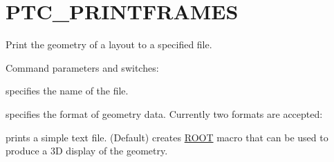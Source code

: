 








\section{PTC\_PRINTFRAMES}
\label{sec:ptc-printframes}

Print the \ptc geometry of a layout to a specified file.


Command parameters and switches:
\begin{madlist}
    specifies the name of the file.

    specifies the format of geometry data.
     Currently two formats are accepted:
     \begin{madlist}
	 prints a simple text file. (Default)
	 creates \href{http://root.cern.ch}{ROOT}
          macro that can be used to produce a 3D display of the geometry.
     \end{madlist}
\end{madlist}



